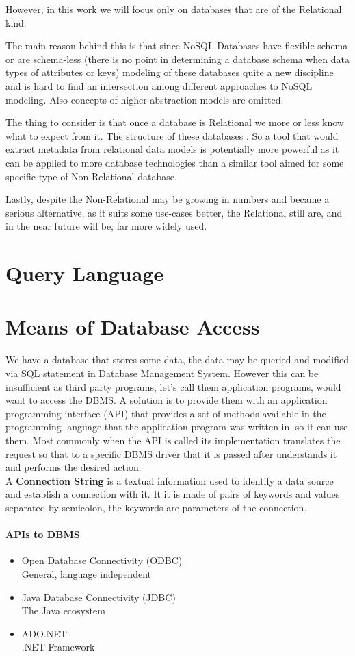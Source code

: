 
However, in this work we will focus only on databases that are of the Relational kind. 

The main reason behind this is that since NoSQL Databases have flexible schema or are schema-less (there is no point in determining a database schema when data types of attributes or keys) modeling of these databases quite a new discipline and is hard to find an intersection among different approaches to NoSQL modeling.
Also concepts of higher abstraction models are omitted. \cite{NoSQLDatabaseModeling}

The thing to consider is that once a database is Relational we more or less know what to expect from it. The structure of these databases . So a tool that would extract metadata from relational data models is potentially more powerful as it can be applied to more database technologies than a similar tool aimed for some specific type of Non-Relational database. 

Lastly, despite the Non-Relational may be growing in numbers and became a serious alternative, as it suits some use-cases better, the Relational still are, and in the near future will be, far more widely used.

\section{Query Language}


\section{Means of Database Access}

We have a database that stores some data, the data may be queried and modified via SQL statement in Database Management System. However this can be insufficient as third party programs, let's call them application programs, would want to access the DBMS. 
A solution is to provide them with an application programming interface (API) that provides a set of methods available in the programming language that the application program was written in, so it can use them.
Most commonly when the API is called its implementation translates the request so that to a specific DBMS driver that it is passed after understands it and performs the desired action. \\

A \textbf{Connection String} is a textual information used to identify a data source and establish a connection with it. It it is made of pairs of keywords and values separated by semicolon, the keywords are parameters of the connection.

\paragraph{APIs to DBMS}
\begin{itemize}
	\item Open Database Connectivity (ODBC)\\
		General, language independent
	\item Java Database Connectivity (JDBC)\\
		The Java ecosystem
	\item ADO.NET\\
		.NET Framework
\end{itemize}